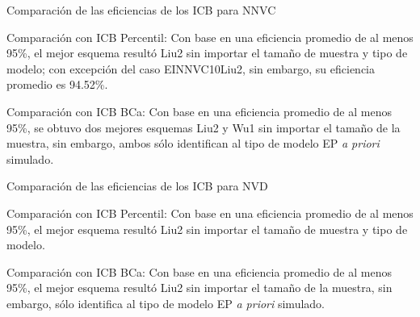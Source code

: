 \documentclass[serif, aspectratio=169]{beamer}
\begin{document}

\begin{frame}{Comparación de las eficiencias de los ICB para NNVC}
  \begin{exampleblock}{Comparación con ICB Percentil:}
  		Con base en una eficiencia promedio de al menos 95\%, el mejor esquema resultó Liu2 sin importar el tamaño de muestra y tipo de modelo; con excepción del caso EINNVC10Liu2, sin embargo, su eficiencia promedio es 94.52\%.
  \end{exampleblock}
  
  \begin{exampleblock}{Comparación con ICB BCa:}
  	Con base en una eficiencia promedio de al menos 95\%, se obtuvo dos mejores esquemas Liu2 y Wu1 sin importar el tamaño de la muestra, sin embargo, ambos sólo identifican al tipo de modelo EP \textit{a priori} simulado.
  \end{exampleblock}
\end{frame}



\begin{frame}{Comparación de las eficiencias de los ICB para NVD}
	\begin{exampleblock}{Comparación con ICB Percentil:}
		Con base en una eficiencia promedio de al menos 95\%, el mejor esquema resultó Liu2 sin importar el tamaño de muestra y tipo de modelo.
	\end{exampleblock}
	
	\begin{exampleblock}{Comparación con ICB BCa:}
		 Con base en una eficiencia promedio de al menos 95\%, el mejor esquema resultó Liu2 sin importar el tamaño de la muestra, sin embargo, sólo identifica al tipo de modelo EP \textit{a priori} simulado.
	\end{exampleblock}
\end{frame}


\end{document}

